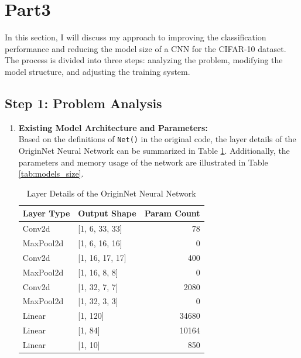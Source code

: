 \documentclass[conference]{IEEEtran}
\begin{document}
	
	\section{Part3}
	In this section, I will discuss my approach to improving the classification performance and reducing the model size of a CNN for the CIFAR-10 dataset. The process is divided into three steps: analyzing the problem, modifying the model structure, and adjusting the training system.
	
	\subsection{Step 1: Problem Analysis}
	\begin{enumerate}
		\item \textbf{Existing Model Architecture and Parameters: }\\
		Based on the definitions of \texttt{Net()} in the original code, the layer details of the OriginNet Neural Network can be summarized in Table \ref{tab:origin_network_layers}. Additionally, the parameters and memory usage of the network are illustrated in Table \ref{tab:models_size}.
		
		\begin{table}[h]
			\centering
			\begin{tabular}{|l|l|r|}
				\hline
				\textbf{Layer Type} & \textbf{Output Shape} & \textbf{Param Count} \\ \hline
				Conv2d              & [1, 6, 33, 33]        & 78                   \\ \hline
				MaxPool2d           & [1, 6, 16, 16]        & 0                    \\ \hline
				Conv2d              & [1, 16, 17, 17]       & 400                  \\ \hline
				MaxPool2d           & [1, 16, 8, 8]         & 0                    \\ \hline
				Conv2d              & [1, 32, 7, 7]         & 2080                 \\ \hline
				MaxPool2d           & [1, 32, 3, 3]         & 0                    \\ \hline
				Linear              & [1, 120]              & 34680                \\ \hline
				Linear              & [1, 84]               & 10164                \\ \hline
				Linear              & [1, 10]               & 850                  \\ \hline
			\end{tabular}
			\caption{Layer Details of the OriginNet Neural Network}
			\label{tab:origin_network_layers}
		\end{table}        
		

\end{enumerate}
\end{document}
